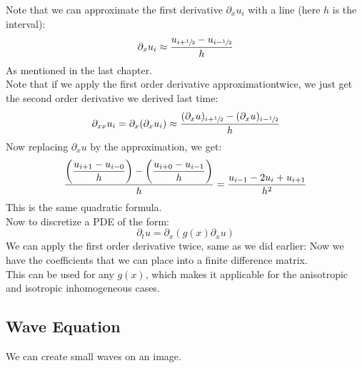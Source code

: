 \documentclass[12pt]{article}
\begin{document}
Note that we can approximate the first derivative
$\partial_x u_i$ with a line
(here $h$ is the interval):
\[ \partial_x u_i \approx \dfrac{u_{i + \sfrac{1}{2}}
- u_{i - \sfrac{1}{2}}}{h} \]
As mentioned in the last chapter. \\

Note that if we apply the first order derivative
approximationtwice, we just get the second order 
derivative we derived last time:
\[ \partial_{xx} u_i
= \partial_{x}(\partial_x u_i) 
\approx \dfrac{(\partial_x u)_{i + \sfrac{1}{2}}
- (\partial_x u)_{i - \sfrac{1}{2}}}{h} \]
Now replacing $\partial_x u$ by the
approximation, we get: 
\[ \dfrac{\left( \dfrac{u_{i + 1}
- u_{i - 0}}{h} \right) - \left( \dfrac{u_{i + 0}
- u_{i - 1}}{h} \right)}{h}
= \dfrac{u_{i-1} - 2u_{i} + u_{i+1}}{h^2} \]
This is the same quadratic formula. \\

Now to discretize a PDE of the form:
\[ \partial_t u
= \partial_x(g(x) \partial_x u) \]
We can apply the first order derivative
twice, same as we did earlier:
Now we have the coefficients that we can place
into a finite difference matrix. \\
This can be used for any $g(x)$,
which makes it applicable for the anisotropic
and isotropic inhomogeneous cases. \\

\newpage

\subsection*{Wave Equation}

We can create small waves on an image. \\
\end{document}
